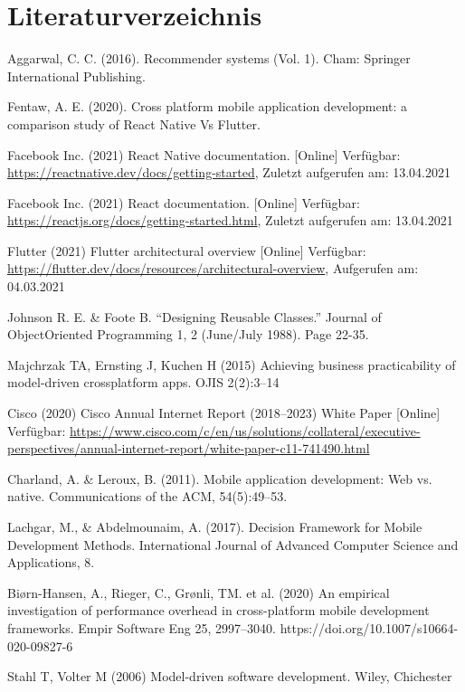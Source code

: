 \documentclass[11pt,a4paper]{article}
\begin{document}
\section*{Literaturverzeichnis}
\begin{itemize}
	 Aggarwal, C. C. (2016). Recommender systems (Vol. 1). Cham: Springer International Publishing.
	
	 Fentaw, A. E. (2020). Cross platform mobile application development: a comparison study of React Native Vs Flutter.
	
	 Facebook Inc. (2021) React Native documentation. [Online] Verfügbar: \url{https://reactnative.dev/docs/getting-started}, Zuletzt aufgerufen am: 13.04.2021
	
	 Facebook Inc. (2021) React documentation. [Online] Verfügbar: \url{https://reactjs.org/docs/getting-started.html}, Zuletzt aufgerufen am: 13.04.2021 
	 
	 Flutter (2021) Flutter architectural overview [Online] Verfügbar: \url{https://flutter.dev/docs/resources/architectural-overview}, Aufgerufen am: 04.03.2021
	
	 Johnson R. E. \&  Foote B. “Designing Reusable Classes.” Journal of ObjectOriented Programming 1, 2 (June/July 1988). Page 22-35.
	
	 Majchrzak TA, Ernsting J, Kuchen H (2015) Achieving business practicability of model-driven crossplatform apps. OJIS 2(2):3–14
	
	 Cisco (2020) Cisco Annual Internet Report (2018–2023) White Paper [Online] Verfügbar: \url{https://www.cisco.com/c/en/us/solutions/collateral/executive-perspectives/annual-internet-report/white-paper-c11-741490.html}
	
	 Charland, A. \& Leroux, B. (2011). Mobile application development: Web vs. native. Communications of the ACM, 54(5):49–53.
	
	 Lachgar, M., \& Abdelmounaim, A. (2017). Decision Framework for Mobile Development Methods. International Journal of Advanced Computer Science and Applications, 8.
	
	 Biørn-Hansen, A., Rieger, C., Grønli, TM. et al. (2020) An empirical investigation of performance overhead in cross-platform mobile development frameworks. Empir Software Eng 25, 2997–3040. https://doi.org/10.1007/s10664-020-09827-6
	
	 Stahl T, Volter M (2006) Model-driven software development. Wiley, Chichester
\end{itemize}
\end{document}
